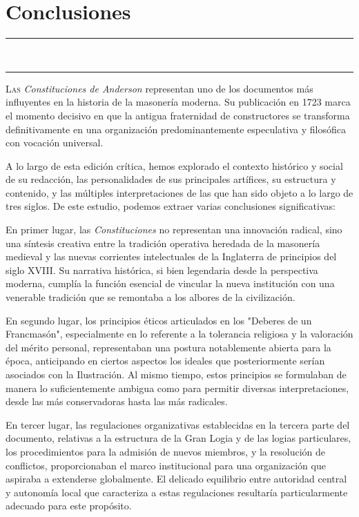 \documentclass[a4paper,12pt,twoside]{book}
\newcommand{\ornline}{%
\begin{center}
\textcolor{dorado}{{\LARGE\rule{0.2\textwidth}{0.4pt}}~\scalebox{1.2}{❧}~\scalebox{1.2}{❧}~\scalebox{1.2}{❧}~
{\LARGE\rule{0.2\textwidth}{0.4pt}}}
\end{center}}
\begin{document}
\chapter{Conclusiones}

\ornline
\vspace{1cm}

\lettrine[lines=3, lhang=0.1, loversize=0.1]{\textcolor{borgoña}{L}}{as} \textit{Constituciones de Anderson} representan uno de los documentos más influyentes en la historia de la masonería moderna. Su publicación en 1723 marca el momento decisivo en que la antigua fraternidad de constructores se transforma definitivamente en una organización predominantemente especulativa y filosófica con vocación universal.

A lo largo de esta edición crítica, hemos explorado el contexto histórico y social de su redacción, las personalidades de sus principales artífices, su estructura y contenido, y las múltiples interpretaciones de las que han sido objeto a lo largo de tres siglos. De este estudio, podemos extraer varias conclusiones significativas:

En primer lugar, las \textit{Constituciones} no representan una innovación radical, sino una síntesis creativa entre la tradición operativa heredada de la masonería medieval y las nuevas corrientes intelectuales de la Inglaterra de principios del siglo XVIII. Su narrativa histórica, si bien legendaria desde la perspectiva moderna, cumplía la función esencial de vincular la nueva institución con una venerable tradición que se remontaba a los albores de la civilización.

En segundo lugar, los principios éticos articulados en los "Deberes de un Francmasón", especialmente en lo referente a la tolerancia religiosa y la valoración del mérito personal, representaban una postura notablemente abierta para la época, anticipando en ciertos aspectos los ideales que posteriormente serían asociados con la Ilustración. Al mismo tiempo, estos principios se formulaban de manera lo suficientemente ambigua como para permitir diversas interpretaciones, desde las más conservadoras hasta las más radicales.

En tercer lugar, las regulaciones organizativas establecidas en la tercera parte del documento, relativas a la estructura de la Gran Logia y de las logias particulares, los procedimientos para la admisión de nuevos miembros, y la resolución de conflictos, proporcionaban el marco institucional para una organización que aspiraba a extenderse globalmente. El delicado equilibrio entre autoridad central y autonomía local que caracteriza a estas regulaciones resultaría particularmente adecuado para este propósito.
\end{document}
